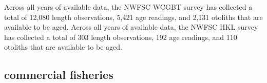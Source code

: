 \documentclass[11pt,
  english,
  letterpaper,
]{article}
\begin{document}
\leavevmode\tagmcend\tagstructend\par


Across all years of available data, the NWFSC WCGBT survey has collected a total of 12,080 length observations, 5,421 age readings, and 2,131 otoliths that are available to be aged. Across all years of available data, the NWFSC HKL survey has collected a total of 303 length observations, 192 age readings, and 110 otoliths that are available to be aged.

\leavevmode\tagmcend\tagstructend\par


\hypertarget{commercial-fisheries-11}{%
\subsection{commercial fisheries}\label{commercial-fisheries-11}}

\leavevmode\tagmcend\tagstructend


\begingroup\fontsize{10}{12}\selectfont \begingroup\fontsize{10}{12}\selectfont

\leavevmode\tagmcend\tagstructend\par
\end{document}
